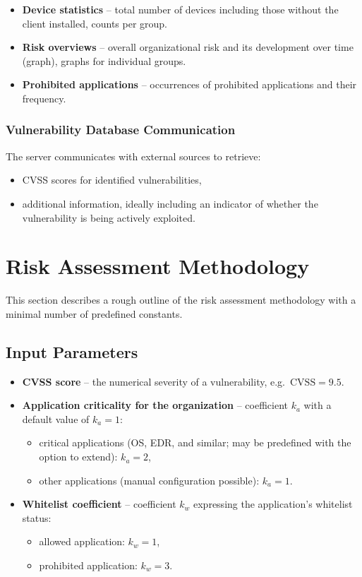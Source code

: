 \begin{itemize}
    \item \textbf{Device statistics} -- total number of devices including those without the client installed, counts per group.
    \item \textbf{Risk overviews} -- overall organizational risk and its development over time (graph), graphs for individual groups.
    \item \textbf{Prohibited applications} -- occurrences of prohibited applications and their frequency.
\end{itemize}

\subsubsection{Vulnerability Database Communication}

The server communicates with external sources to retrieve:

\begin{itemize}
    \item CVSS scores for identified vulnerabilities,
    \item additional information, ideally including an indicator of whether the vulnerability is being actively exploited.
\end{itemize}

\section{Risk Assessment Methodology}

This section describes a rough outline of the risk assessment methodology with a minimal number of predefined constants.

\subsection{Input Parameters}

\begin{itemize}
    \item \textbf{CVSS score} -- the numerical severity of a vulnerability, e.g.\ $\text{CVSS} = 9{.}5$.
    \item \textbf{Application criticality for the organization} -- coefficient $k_a$ with a default value of $k_a = 1$:
    \begin{itemize}
        \item critical applications (OS, EDR, and similar; may be predefined with the option to extend): $k_a = 2$,
        \item other applications (manual configuration possible): $k_a = 1$.
    \end{itemize}
    \item \textbf{Whitelist coefficient} -- coefficient $k_w$ expressing the application's whitelist status:
    \begin{itemize}
        \item allowed application: $k_w = 1$,
        \item prohibited application: $k_w = 3$.
    \end{itemize}
\end{itemize}

